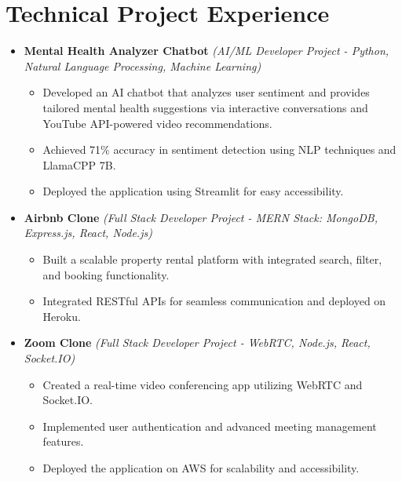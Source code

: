\documentclass[letterpaper,9pt]{article}
\begin{document}
\section*{Technical Project Experience}
\begin{itemize}

\item \textbf{Mental Health Analyzer Chatbot} \textit{(AI/ML Developer Project - Python, Natural Language Processing, Machine Learning)}
\begin{itemize}
    \item Developed an AI chatbot that analyzes user sentiment and provides tailored mental health suggestions via interactive conversations and YouTube API-powered video recommendations.
    \item Achieved 71\% accuracy in sentiment detection using NLP techniques and LlamaCPP 7B.
    \item Deployed the application using Streamlit for easy accessibility.
\end{itemize}

\item \textbf{Airbnb Clone} \textit{(Full Stack Developer Project - MERN Stack: MongoDB, Express.js, React, Node.js)}
\begin{itemize}
    \item Built a scalable property rental platform with integrated search, filter, and booking functionality.
    \item Integrated RESTful APIs for seamless communication and deployed on Heroku.
\end{itemize}

\item \textbf{Zoom Clone} \textit{(Full Stack Developer Project - WebRTC, Node.js, React, Socket.IO)}
\begin{itemize}
    \item Created a real-time video conferencing app utilizing WebRTC and Socket.IO.
    \item Implemented user authentication and advanced meeting management features.
    \item Deployed the application on AWS for scalability and accessibility.
\end{itemize}

\end{itemize}


\end{document}
